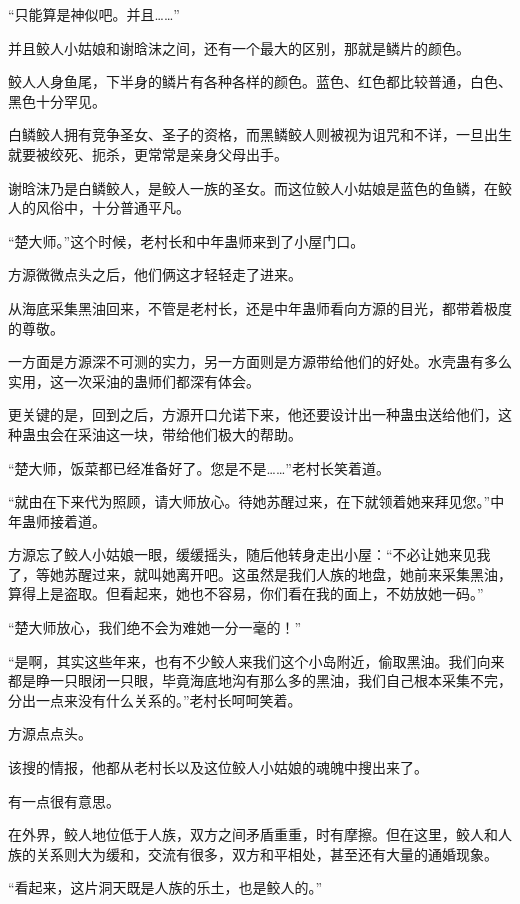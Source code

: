 \begin{this_body}
“只能算是神似吧。并且……”

并且鲛人小姑娘和谢晗沫之间，还有一个最大的区别，那就是鳞片的颜色。

鲛人人身鱼尾，下半身的鳞片有各种各样的颜色。蓝色、红色都比较普通，白色、黑色十分罕见。

白鳞鲛人拥有竞争圣女、圣子的资格，而黑鳞鲛人则被视为诅咒和不详，一旦出生就要被绞死、扼杀，更常常是亲身父母出手。

谢晗沫乃是白鳞鲛人，是鲛人一族的圣女。而这位鲛人小姑娘是蓝色的鱼鳞，在鲛人的风俗中，十分普通平凡。

“楚大师。”这个时候，老村长和中年蛊师来到了小屋门口。

方源微微点头之后，他们俩这才轻轻走了进来。

从海底采集黑油回来，不管是老村长，还是中年蛊师看向方源的目光，都带着极度的尊敬。

一方面是方源深不可测的实力，另一方面则是方源带给他们的好处。水壳蛊有多么实用，这一次采油的蛊师们都深有体会。

更关键的是，回到之后，方源开口允诺下来，他还要设计出一种蛊虫送给他们，这种蛊虫会在采油这一块，带给他们极大的帮助。

“楚大师，饭菜都已经准备好了。您是不是……”老村长笑着道。

“就由在下来代为照顾，请大师放心。待她苏醒过来，在下就领着她来拜见您。”中年蛊师接着道。

方源忘了鲛人小姑娘一眼，缓缓摇头，随后他转身走出小屋：“不必让她来见我了，等她苏醒过来，就叫她离开吧。这虽然是我们人族的地盘，她前来采集黑油，算得上是盗取。但看起来，她也不容易，你们看在我的面上，不妨放她一码。”

“楚大师放心，我们绝不会为难她一分一毫的！”

“是啊，其实这些年来，也有不少鲛人来我们这个小岛附近，偷取黑油。我们向来都是睁一只眼闭一只眼，毕竟海底地沟有那么多的黑油，我们自己根本采集不完，分出一点来没有什么关系的。”老村长呵呵笑着。

方源点点头。

该搜的情报，他都从老村长以及这位鲛人小姑娘的魂魄中搜出来了。

有一点很有意思。

在外界，鲛人地位低于人族，双方之间矛盾重重，时有摩擦。但在这里，鲛人和人族的关系则大为缓和，交流有很多，双方和平相处，甚至还有大量的通婚现象。

“看起来，这片洞天既是人族的乐土，也是鲛人的。”

\end{this_body}

